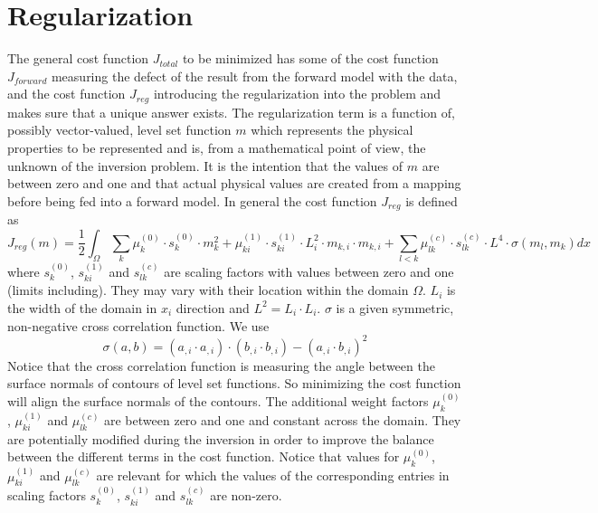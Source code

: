 \chapter{Regularization}\label{Chp:ref:regularization}

The general cost function $J_{total}$ to be minimized has some of the cost
function $J_{forward}$ measuring the defect of the result from the
forward model with the data, and the cost function $J_{reg}$ introducing the
regularization into the problem and makes sure that a unique answer exists.
The regularization term is a function of, possibly vector-valued, level set
function $m$ which represents the physical properties to be represented and is,
from a mathematical point of view, the unknown of the inversion problem.
It is the intention that the values of $m$ are between zero and one and that
actual physical values are created from a mapping before being fed into a
forward model. In general the cost function $J_{reg}$ is defined as 
\begin{equation}\label{EQU:REG:1}
J_{reg}(m) = \frac{1}{2} \int_{\Omega} 
 \sum_{k} \mu^{(0)}_k \cdot s^{(0)}_k \cdot m_k^2 +  \mu^{(1)}_{ki} \cdot s^{(1)}_{ki} \cdot L_i^2  \cdot m_{k,i} \cdot m_{k,i}
+  \sum_{l<k} \mu^{(c)}_{lk} \cdot s^{(c)}_{lk} \cdot L^4  \cdot  \sigma(m_l,m_k) dx 
\end{equation} 
where $s^{(0)}_k$, $s^{(1)}_{ki}$ and $s^{(c)}_{lk}$ are scaling factors with
values between zero and one (limits including).
They may vary with their location within the domain $\Omega$.
$L_i$ is the width of the domain in $x_i$ direction and $L^2=L_i \cdot L_i$.
$\sigma$ is a given symmetric, non-negative cross correlation function.
We use
\begin{equation}\label{EQU:REG:4}
 \sigma(a,b) =  ( a_{,i} \cdot a_{,i}) \cdot ( b_{,i} \cdot b_{,i}) -   ( a_{,i} \cdot b_{,i})^2 
\end{equation} 
Notice that the cross correlation function is measuring the angle between the
surface normals of contours of level set functions.
So minimizing the cost function will align the surface normals of the contours.
The additional weight factors $\mu^{(0)}_k$, $ \mu^{(1)}_{ki}$ and
$\mu^{(c)}_{lk}$ are between zero and one and constant across the domain.
They are potentially modified during the inversion in order to improve the
balance between the different terms in the cost function.
Notice that values for $\mu^{(0)}_k$, $ \mu^{(1)}_{ki}$ and $\mu^{(c)}_{lk}$
are relevant for which the values of the corresponding entries in scaling
factors $s^{(0)}_k$, $s^{(1)}_{ki}$ and $s^{(c)}_{lk}$ are non-zero.

